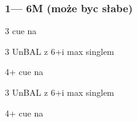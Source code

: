 \documentclass[12pt, a4paper]{article}
\begin{document}
\subsubsection*{1\major {}\major --- 6M (może byc słabe)}
\sequence{{1\diams}{1\hearts}{2\ntx}{3\hearts}}
\begin{options}[1]
    \item[3\spades] cue na \hearts
    \item[3\nt] UnBAL z 6+\diams i max singlem \hearts
    \item[4\clubs+] cue na \hearts
\end{options}

\sequence{{1\diams}{1\spades}{2\ntx}{3\spades}}
\begin{options}[1]
    \item[3\nt] UnBAL z 6+\diams i max singlem \spades
    \item[4\clubs+] cue na \spades
\end{options}
\end{document}
